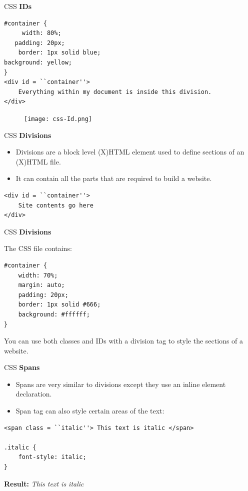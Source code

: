 \documentclass[14pt]{beamer}
\begin{document}
\begin{frame}[fragile]{CSS}
\textbf{IDs}
\begin{lstlisting}
#container {
     width: 80%;
   padding: 20px;
    border: 1px solid blue;
background: yellow;
}
<div id = ``container''>
    Everything within my document is inside this division.
</div>
\end{lstlisting}
\begin{figure}[H]
\texttt{[image: css-Id.png]}
\end{figure}
\end{frame}

\begin{frame}[fragile]{CSS}
\textbf{Divisions}
\begin{itemize}
 \item Divisions are a block level (X)HTML element used to define sections of an (X)HTML file.
 \item It can contain all the parts that are required to build a website.
\end{itemize}
\begin{lstlisting}[xleftmargin=32pt]
<div id = ``container''>
    Site contents go here
</div>
\end{lstlisting}
\end{frame}

\begin{frame}[fragile]{CSS}
\textbf{Divisions}
\begin{block}{The CSS file contains:}
\begin{lstlisting}
#container {
    width: 70%;
    margin: auto;
    padding: 20px;
    border: 1px solid #666;
    background: #ffffff;
}
\end{lstlisting}
\end{block}
You can use both classes and IDs with a division tag to style the sections of a website.
\end{frame}

\begin{frame}[fragile]{CSS}
\textbf{Spans}
\begin{itemize}
 \item Spans are very similar to divisions except they use an inline element declaration.
 \item Span tag can also style certain areas of the text:
\end{itemize}
\begin{lstlisting}[xleftmargin=32pt]
<span class = ``italic''> This text is italic </span>

.italic {
    font-style: italic;
}
\end{lstlisting}
\textbf{Result:} \em{This text is italic}
\end{frame}
\end{document}
